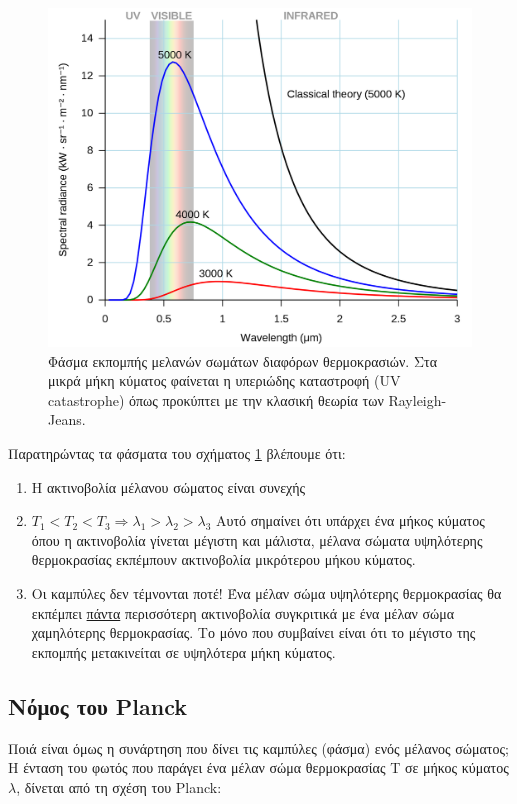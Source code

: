 \begin{figure}[h]
    \centering
    \includegraphics[scale=0.15]{Figures/black_body_spectrum.png}
    \caption{Φάσμα εκπομπής μελανών σωμάτων διαφόρων θερμοκρασιών. Στα μικρά μήκη κύματος φαίνεται η υπεριώδης καταστροφή (UV catastrophe) όπως προκύπτει με την κλασική θεωρία των Rayleigh-Jeans.}
    \label{fig:black_body_spectrum}
\end{figure}

Παρατηρώντας τα φάσματα του σχήματος \ref{fig:black_body_spectrum} βλέπουμε ότι:

\begin{enumerate}
    \item Η ακτινοβολία μέλανου σώματος είναι συνεχής
    \item $T_1 < T_2 < T_3 \Rightarrow \lambda_1 > \lambda_2 > \lambda_3$
    Αυτό σημαίνει ότι υπάρχει ένα μήκος κύματος όπου η ακτινοβολία γίνεται μέγιστη και μάλιστα,  μέλανα σώματα υψηλότερης θερμοκρασίας εκπέμπουν ακτινοβολία μικρότερου μήκου κύματος.
    \item Οι καμπύλες δεν τέμνονται ποτέ! Ένα μέλαν σώμα υψηλότερης θερμοκρασίας θα εκπέμπει \underline{πάντα} περισσότερη ακτινοβολία συγκριτικά με ένα μέλαν σώμα χαμηλότερης θερμοκρασίας. Το μόνο που συμβαίνει είναι ότι το μέγιστο της εκπομπής μετακινείται σε υψηλότερα μήκη κύματος.
\end{enumerate}

\subsection{Νόμος του Planck}
Ποιά είναι όμως η συνάρτηση που δίνει τις καμπύλες (φάσμα) ενός μέλανος σώματος;
Η ένταση του φωτός που παράγει ένα μέλαν σώμα θερμοκρασίας Τ σε μήκος κύματος $\lambda$, δίνεται από τη σχέση του Planck:

